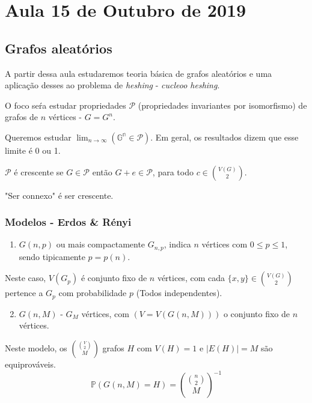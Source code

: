 \section{Aula 15 de Outubro de 2019}
\label{2019_10_15}

\subsection{Grafos aleatórios}

A partir dessa aula estudaremos teoria básica de grafos aleatórios e uma aplicação desses ao problema de \emph{heshing} - \emph{cucleoo heshing}.

O foco seŕa estudar propriedades $\mathcal{P}$ (propriedades invariantes por isomorfismo) de grafos de $n$ vértices - $G = G^n$.

Queremos estudar $\lim_{n \rightarrow \infty}\mathbb{(G^n \in \mathcal{P})}$. Em geral, os resultados dizem que esse limite é 0 ou 1.

\begin{definicao}
$\mathcal{P}$ é crescente se $G \in \mathcal{P}$ então $G + e \in \mathcal{P}$, para todo $c \in \binom{V(G)}{2}$.
\end{definicao}{}

\begin{exemplo}
"Ser connexo" é ser crescente.
\end{exemplo}{}

\subsubsection{Modelos - Erdos \& Rényi}
\begin{enumerate}
    \item $G(n, p)$ ou mais compactamente $G_{n,p}$, indica $n$ vértices com $0\leq p \leq 1$, sendo tipicamente $p = p(n)$.
\end{enumerate}

Neste caso, $V(G_p)$ é conjunto fixo de $n$ vértices, com cada $\{x, y\} \in \binom{V(G)}{2}$ pertence a $G_p$ com probabilidade $p$ (Todos independentes).

\begin{enumerate}    
\setcounter{enumi}{1}
    \item $G(n, M)$ - $G_M$ vértices, com $(V = V(G(n, M)))$ o conjunto fixo de $n$ vértices.
\end{enumerate}

Neste modelo, os $\binom{\binom{V}{2}}{M}$ grafos $H$ com $V(H) = 1$ e $|E(H)| = M$ são equiprováveis.
\begin{equation*}
    \mathbb{P}(G(n, M) = H) = \binom{\binom{n}{2}}{M}^{-1}
\end{equation*}{}

